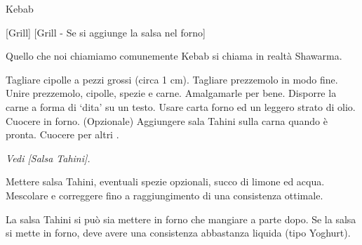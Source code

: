 \begin{recipe}{Kebab}
    \begin{header}

        [Grill]
        [Grill - Se si aggiunge la salsa nel forno]
    \end{header}

    \begin{introduction}
        Quello che noi chiamiamo comunemente Kebab si chiama in realtà Shawarma.
    \end{introduction}

    \begin{ingredients}[15]
        
    \end{ingredients}

    \begin{preparation}
        \step Tagliare cipolle a pezzi grossi (circa 1 cm).
        \step Tagliare prezzemolo in modo fine.
        \step Unire prezzemolo, cipolle, spezie e carne. Amalgamarle per bene.
        \step Disporre la carne a forma di `dita' su un testo. Usare carta forno ed un leggero strato di olio.
        \step Cuocere in forno.
        \step (Opzionale) Aggiungere sala Tahini sulla carna quando è pronta. Cuocere per altri .
        \step*
        \step*
    \end{preparation}

    \begin{preparation}
        \par \textit{Vedi [Salsa Tahini].}
        
        \step Mettere salsa Tahini, eventuali spezie opzionali, succo di limone ed acqua.
        \step Mescolare e correggere fino a raggiungimento di una consistenza ottimale.
    \end{preparation}

    \begin{suggestion}
        \suggestionMark La salsa Tahini si può sia mettere in forno che mangiare a parte dopo.
        \suggestionMark Se la salsa si mette in forno, deve avere una consistenza abbastanza liquida (tipo Yoghurt). 
    \end{suggestion}
\end{recipe}
